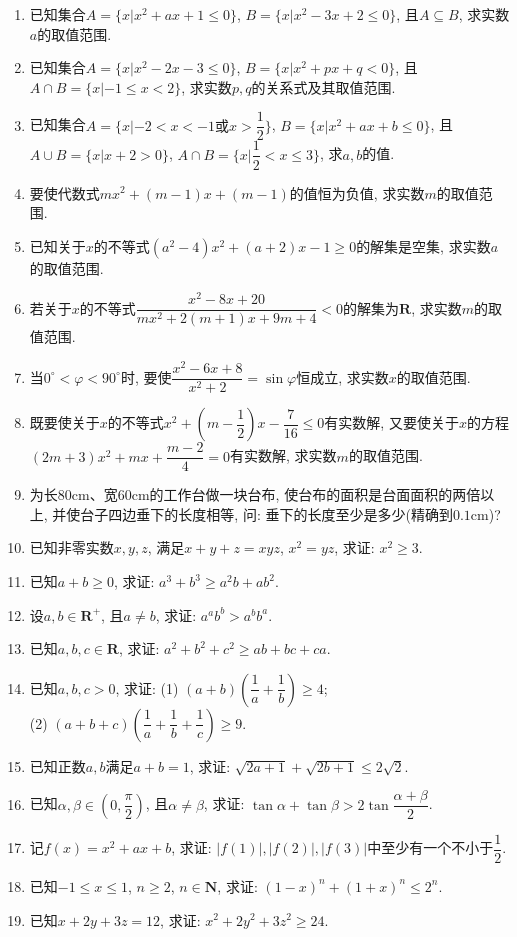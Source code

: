 \documentclass[10pt,a4paper]{article}
\begin{document}
\begin{enumerate}[1.]
\item 已知集合$A=\{x|x^2+ax+1\le 0\}$, $B=\{x|x^2-3x+2\le 0\}$, 且$A\subseteq B$, 求实数$a$的取值范围.
\item 已知集合$A=\{x|x^2-2x-3\le 0\}$, $B=\{x|x^2+px+q<0\}$, 且$A\cap B=\{x|-1\le x<2\}$, 求实数$p,q$的关系式及其取值范围.
\item 已知集合$A=\{x|-2<x<-1\text{或}x>\dfrac 12\}$, $B=\{x|x^2+ax+b\le 0\}$, 且$A\cup B=\{x|x+2>0\}$, $A\cap B=\{x|\dfrac 12<x\le 3\}$, 求$a,b$的值.
\item 要使代数式$mx^2+(m-1)x+(m-1)$的值恒为负值, 求实数$m$的取值范围.
\item 已知关于$x$的不等式$(a^2-4)x^2+(a+2)x-1\ge 0$的解集是空集, 求实数$a$的取值范围.
\item 若关于$x$的不等式$\dfrac{x^2-8x+20}{mx^2+2(m+1)x+9m+4}<0$的解集为$\mathbf{R}$, 求实数$m$的取值范围.
\item 当$0^\circ <\varphi <90^\circ$时, 要使$\dfrac{x^2-6x+8}{x^2+2}=\sin \varphi$恒成立, 求实数$x$的取值范围.
\item 既要使关于$x$的不等式$x^2+(m-\dfrac 12)x-\dfrac 7{16}\le 0$有实数解, 又要使关于$x$的方程$(2m+3)x^2+mx+\dfrac{m-2}4=0$有实数解, 求实数$m$的取值范围.
\item 为长$80\text{cm}$、宽$60\text{cm}$的工作台做一块台布, 使台布的面积是台面面积的两倍以上, 并使台子四边垂下的长度相等, 问: 垂下的长度至少是多少(精确到$0.1\text{cm}$)?
\item 已知非零实数$x,y,z$, 满足$x+y+z=xyz$, $x^2=yz$, 求证: $x^2\ge 3$.
\item 已知$a+b\ge 0$, 求证: $a^3+b^3\ge a^2b+ab^2$.
\item 设$a,b\in \mathbf{R}^+$, 且$a\ne b$, 求证: $a^ab^b>a^bb^a$.
\item 已知$a,b,c\in \mathbf{R}$, 求证: $a^2+b^2+c^2\ge ab+bc+ca$.
\item 已知$a,b,c>0$, 求证:
(1) $(a+b)(\dfrac 1a+\dfrac 1b)\ge 4$;\\
(2) $(a+b+c)(\dfrac 1a+\dfrac 1b+\dfrac 1c)\ge 9$.
\item 已知正数$a,b$满足$a+b=1$, 求证: $\sqrt{2a+1}+\sqrt{2b+1}\le 2\sqrt 2$.
\item 已知$\alpha ,\beta \in (0,\dfrac{\pi}2)$, 且$\alpha \ne \beta$, 求证: $\tan \alpha +\tan \beta >2\tan \dfrac{\alpha +\beta}2$.
\item 记$f(x)=x^2+ax+b$, 求证: $|f(1)|,|f(2)|,|f(3)|$中至少有一个不小于$\dfrac 12$.
\item 已知$-1\le x\le 1$, $n\ge 2$, $n\in \mathbf{N}$, 求证: $(1-x)^n+(1+x)^n\le 2^n$.
\item 已知$x+2y+3z=12$, 求证: $x^2+2y^2+3z^2\ge 24$.

\end{enumerate}
\end{document}
